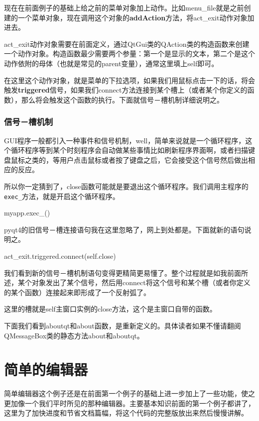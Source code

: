 \documentclass[12pt,oneside]{book}
\begin{document}
\begin{common-format}
现在在前面例子的基础上给之前的菜单对象加上动作。比如menu\_{}file就是之前创建的一个菜单对象，现在调用这个对象的\textbf{addAction}方法，将act\_{}exit动作对象加进去。

act\_{}exit动作对象需要在前面定义，通过QtGui类的QAction类的构造函数来创建一个动作对象。构造函数最少需要两个参量：第一个是显示的文本，第二个是这个动作依附的母体（也就是常见的parent变量），通常这里填上self即可。

在这里这个动作对象，就是菜单的下拉选项，如果我们用鼠标点击一下的话，将会触发\textbf{triggered}信号，如果我们connect方法连接到某个槽上（或者某个你定义的函数），那么将会触发这个函数的执行。下面就信号－槽机制详细说明之。

\subsection{信号－槽机制}
GUI程序一般都引入一种事件和信号机制，well，简单来说就是一个循环程序，这个循环程序等到某个时刻程序会自动做某些事情比如刷新程序界面啊，或者扫描键盘鼠标之类的，等用户点击鼠标或者按了键盘之后，它会接受这个信号然后做出相应的反应。

所以你一定猜到了，close函数可能就是要退出这个循环程序。我们调用主程序的\verb+exec_+方法，就是开启这个循环程序。

\begin{tcbpython}
myapp.exec_()
\end{tcbpython}

pyqt4的旧信号－槽连接语句我在这里忽略了，网上到处都是。下面就新的语句说明之。

\begin{tcbpython}
act_exit.triggered.connect(self.close)
\end{tcbpython}

我们看到新的信号－槽机制语句变得更精简更易懂了。整个过程就是如我前面所述，某个对象发出了某个信号，然后用connect将这个信号和某个槽（或者你定义的某个函数）连接起来即形成了一个反射弧了。

这里的槽就是self主窗口实例的close方法，这个是主窗口自带的函数。

下面我们看到aboutqt和about函数，是重新定义的。具体读者如果不懂请翻阅QMessageBox类的静态方法about和aboutqt。


\chapter{简单的编辑器}
简单编辑器这个例子还是在前面第一个例子的基础上进一步加上了一些功能，使之更加像一个我们平时所见的那种编辑器。主要基本知识前面的第一个例子都讲了，这里为了加快进度和节省文档篇幅，将这个代码的完整版放出来然后慢慢讲解。


\end{common-format}
\end{document}
